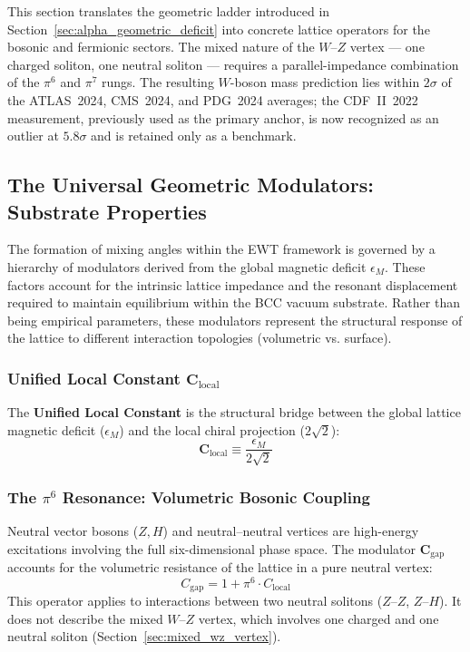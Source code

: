 \documentclass[10pt,a4paper]{article}
\begin{document}
This section translates the geometric ladder introduced in Section~\ref{sec:alpha_geometric_deficit} into concrete lattice operators for the bosonic and fermionic sectors. The mixed nature of the $W$--$Z$ vertex --- one charged soliton, one neutral soliton --- requires a parallel-impedance combination of the $\pi^6$ and $\pi^7$ rungs. The resulting $W$-boson mass prediction lies within $2\sigma$ of the ATLAS~2024, CMS~2024, and PDG~2024 averages; the CDF~II~2022 measurement, previously used as the primary anchor, is now recognized as an outlier at $5.8\sigma$ and is retained only as a benchmark.

\subsection{The Universal Geometric Modulators: Substrate Properties}

The formation of mixing angles within the EWT framework is governed by a hierarchy of modulators derived from the global magnetic deficit $\epsilon_M$. These factors account for the intrinsic lattice impedance and the resonant displacement required to maintain equilibrium within the BCC vacuum substrate. Rather than being empirical parameters, these modulators represent the structural response of the lattice to different interaction topologies (volumetric vs. surface).

\subsubsection{Unified Local Constant $\mathbf{C}_{\text{local}}$}
The \textbf{Unified Local Constant} is the structural bridge between the global lattice magnetic deficit ($\epsilon_{M}$) and the local chiral projection ($2\sqrt{2}$):
\begin{equation}
	\boxed{\mathbf{C}_{\text{local}} \equiv \frac{\epsilon_{M}}{2\sqrt{2}}}
	\label{eq:C_local}
\end{equation}

\subsubsection{The $\pi^6$ Resonance: Volumetric Bosonic Coupling}
\label{sec:natural_pi_6}
Neutral vector bosons ($Z, H$) and neutral--neutral vertices are high-energy excitations involving the full six-dimensional phase space. The modulator $\mathbf{C}_{\text{gap}}$ accounts for the volumetric resistance of the lattice in a pure neutral vertex:
\begin{equation}
	C_{\text{gap}} = 1 + \pi^6 \cdot C_{\text{local}}
\end{equation}
This operator applies to interactions between two neutral solitons ($Z$--$Z$, $Z$--$H$). It does not describe the mixed $W$--$Z$ vertex, which involves one charged and one neutral soliton (Section~\ref{sec:mixed_wz_vertex}).
\end{document}
